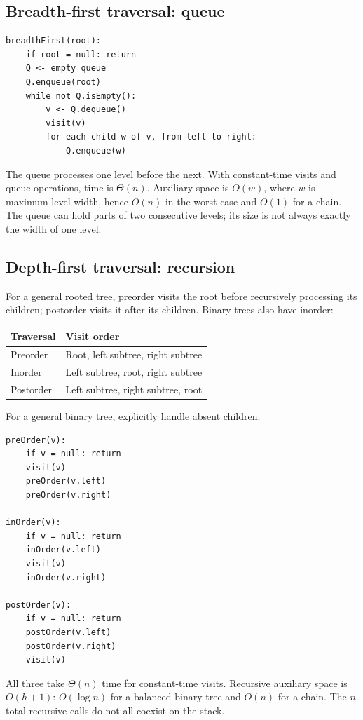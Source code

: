 \documentclass[11pt]{article}
\begin{document}
\subsection{Breadth-first traversal: queue}
\begin{lstlisting}
breadthFirst(root):
    if root = null: return
    Q <- empty queue
    Q.enqueue(root)
    while not Q.isEmpty():
        v <- Q.dequeue()
        visit(v)
        for each child w of v, from left to right:
            Q.enqueue(w)
\end{lstlisting}
The queue processes one level before the next. With constant-time visits and queue operations, time is $\Theta(n)$. Auxiliary space is $O(w)$, where $w$ is maximum level width, hence $O(n)$ in the worst case and $O(1)$ for a chain. The queue can hold parts of two consecutive levels; its size is not always exactly the width of one level.

\subsection{Depth-first traversal: recursion}
For a general rooted tree, preorder visits the root before recursively processing its children; postorder visits it after its children. Binary trees also have inorder:
\begin{center}
\begin{tabular}{ll}
\toprule
Traversal & Visit order\\
\midrule
Preorder & Root, left subtree, right subtree\\
Inorder & Left subtree, root, right subtree\\
Postorder & Left subtree, right subtree, root\\
\bottomrule
\end{tabular}
\end{center}
For a general binary tree, explicitly handle absent children:
\begin{lstlisting}
preOrder(v):
    if v = null: return
    visit(v)
    preOrder(v.left)
    preOrder(v.right)

inOrder(v):
    if v = null: return
    inOrder(v.left)
    visit(v)
    inOrder(v.right)

postOrder(v):
    if v = null: return
    postOrder(v.left)
    postOrder(v.right)
    visit(v)
\end{lstlisting}
All three take $\Theta(n)$ time for constant-time visits. Recursive auxiliary space is $O(h+1)$: $O(\log n)$ for a balanced binary tree and $O(n)$ for a chain. The $n$ total recursive calls do not all coexist on the stack.
\end{document}
